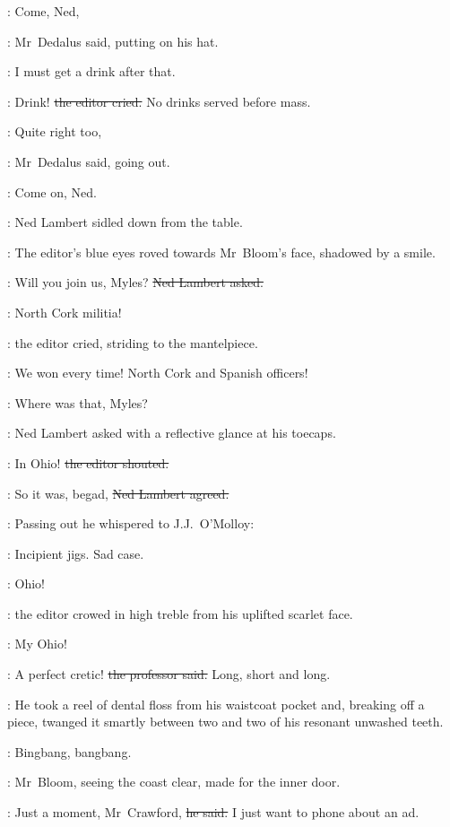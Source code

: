\simon:
Come, Ned,

:
Mr~Dedalus said, putting on his hat.

\simon:
I must get a drink after that.

\crawford:
Drink!
\sout{the editor cried.}
No drinks served before mass.

\simon:
Quite right too,

:
Mr~Dedalus said, going out.

\simon:
Come on, Ned.

:
Ned Lambert sidled down from the table.

:
The editor's blue eyes roved towards Mr~Bloom's face,
shadowed by a smile.

\lambert:
Will you join us, Myles?
\sout{Ned Lambert asked.}



\crawford:
North Cork militia!

:
the editor cried,
striding to the mantelpiece.

\crawford:
We won every time!
North Cork and Spanish officers!

\lambert:
Where was that, Myles?

:
Ned Lambert asked with a reflective glance at his toecaps.

\crawford:
In Ohio!
\sout{the editor shouted.}

\lambert:
So it was, begad,
\sout{Ned Lambert agreed.}

:
Passing out he whispered to J.J.~O'Molloy:

\lambert:
Incipient jigs.
Sad case.

\crawford:
Ohio!

:
the editor crowed in high treble from his uplifted scarlet face.

\crawford:
My Ohio!

\machugh:
A perfect cretic!
\sout{the professor said.}
Long, short and long.




:
He took a reel of dental floss from his waistcoat pocket
and, breaking off a piece,
twanged it smartly between two and two of his resonant unwashed teeth.

\BloomInt:
Bingbang, bangbang.

:
Mr~Bloom, seeing the coast clear,
made for the inner door.

\Bloom:
Just a moment, Mr~Crawford,
\sout{he said.}
I just want to phone about an ad.

